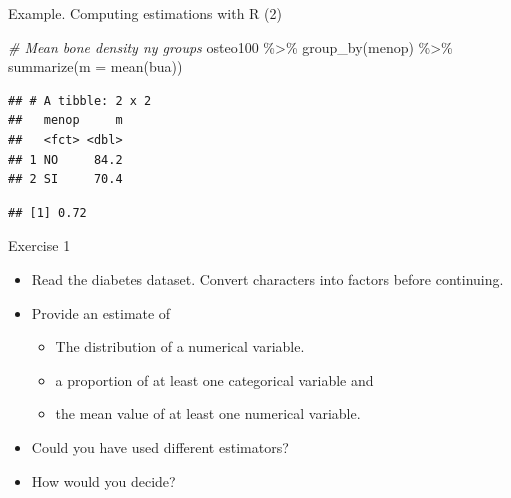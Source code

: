 \documentclass[
  ignorenonframetext,
]{beamer}
\newenvironment{Shaded}{\begin{snugshade}}{\end{snugshade}}
\newcommand{\AttributeTok}[1]{\textcolor[rgb]{0.77,0.63,0.00}{#1}}
\newcommand{\CommentTok}[1]{\textcolor[rgb]{0.56,0.35,0.01}{\textit{#1}}}
\newcommand{\DecValTok}[1]{\textcolor[rgb]{0.00,0.00,0.81}{#1}}
\newcommand{\FunctionTok}[1]{\textcolor[rgb]{0.00,0.00,0.00}{#1}}
\newcommand{\NormalTok}[1]{#1}
\newcommand{\SpecialCharTok}[1]{\textcolor[rgb]{0.00,0.00,0.00}{#1}}
\newcommand{\StringTok}[1]{\textcolor[rgb]{0.31,0.60,0.02}{#1}}
\providecommand{\tightlist}{%
  \setlength{\itemsep}{0pt}\setlength{\parskip}{0pt}}
\begin{document}
\begin{frame}[fragile]{Example. Computing estimations with R (2)}
\protect\hypertarget{example.-computing-estimations-with-r-2}{}
\small

\begin{Shaded}
\begin{Highlighting}[]
\CommentTok{\# Mean bone density ny groups}
\NormalTok{osteo100 }\SpecialCharTok{\%\textgreater{}\%} 
  \FunctionTok{group\_by}\NormalTok{(menop) }\SpecialCharTok{\%\textgreater{}\%} 
  \FunctionTok{summarize}\NormalTok{(}\AttributeTok{m =} \FunctionTok{mean}\NormalTok{(bua))}
\end{Highlighting}
\end{Shaded}

\begin{verbatim}
## # A tibble: 2 x 2
##   menop     m
##   <fct> <dbl>
## 1 NO     84.2
## 2 SI     70.4
\end{verbatim}

\begin{Shaded}
\end{Shaded}

\begin{verbatim}
## [1] 0.72
\end{verbatim}
\end{frame}

\begin{frame}{Exercise 1}
\protect\hypertarget{exercise-1}{}
\begin{itemize}
\tightlist
\item
  Read the diabetes dataset. Convert characters into factors before
  continuing.
\item
  Provide an estimate of

  \begin{itemize}
  \tightlist
  \item
    The distribution of a numerical variable.
  \item
    a proportion of at least one categorical variable and
  \item
    the mean value of at least one numerical variable.
  \end{itemize}
\item
  Could you have used different estimators?
\item
  How would you decide?
\end{itemize}
\end{frame}
\end{document}
